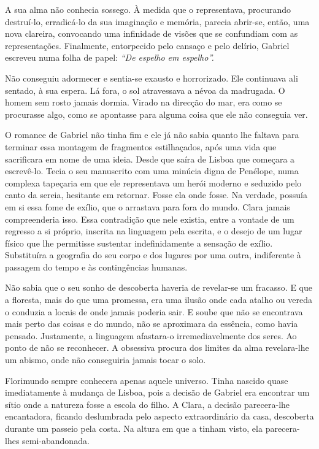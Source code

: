 A sua alma não conhecia sossego. À medida que o representava, procurando
destruí-lo, erradicá-lo da sua imaginação e memória, parecia abrir-se,
então, uma nova clareira, convocando uma infinidade de visões que se
confundiam com as representações. Finalmente, entorpecido pelo cansaço e
pelo delírio, Gabriel escreveu numa folha de papel: \emph{``De espelho
em espelho''.}

Não conseguiu adormecer e sentia-se exausto e horrorizado. Ele
continuava ali sentado, à sua espera. Lá fora, o sol atravessava a névoa
da madrugada. O homem sem rosto jamais dormia. Virado na direcção do
mar, era como se procurasse algo, como se apontasse para alguma coisa
que ele não conseguia ver.

O romance de Gabriel não tinha fim e ele já não sabia quanto lhe faltava
para terminar essa montagem de fragmentos estilhaçados, após uma vida
que sacrificara em nome de uma ideia. Desde que saíra de Lisboa que
começara a escrevê-lo. Tecia o seu manuscrito com uma minúcia digna de
Penélope, numa complexa tapeçaria em que ele representava um herói
moderno e seduzido pelo canto da sereia, hesitante em retornar. Fosse
ela onde fosse. Na verdade, possuía em si essa fome de exílio, que o
arrastava para fora do mundo. Clara jamais compreenderia isso. Essa
contradição que nele existia, entre a vontade de um regresso a si
próprio, inscrita na linguagem pela escrita, e o desejo de um lugar
físico que lhe permitisse sustentar indefinidamente a sensação de
exílio. Substituíra a geografia do seu corpo e dos lugares por uma
outra, indiferente à passagem do tempo e às contingências humanas.

Não sabia que o seu sonho de descoberta haveria de revelar-se um
fracasso. E que a floresta, mais do que uma promessa, era uma ilusão
onde cada atalho ou vereda o conduzia a locais de onde jamais poderia
sair. E soube que não se encontrava mais perto das coisas e do mundo,
não se aproximara da essência, como havia pensado. Justamente, a
linguagem afastara-o irremediavelmente dos seres. Ao ponto de não se
reconhecer. A obsessiva procura dos limites da alma revelara-lhe um
abismo, onde não conseguiria jamais tocar o solo.

Florimundo sempre conhecera apenas aquele universo. Tinha nascido quase
imediatamente à mudança de Lisboa, pois a decisão de Gabriel era
encontrar um sítio onde a natureza fosse a escola do filho. A Clara, a
decisão parecera-lhe encantadora, ficando deslumbrada pelo aspecto
extraordinário da casa, descoberta durante um passeio pela costa. Na
altura em que a tinham visto, ela parecera-lhes semi-abandonada.

